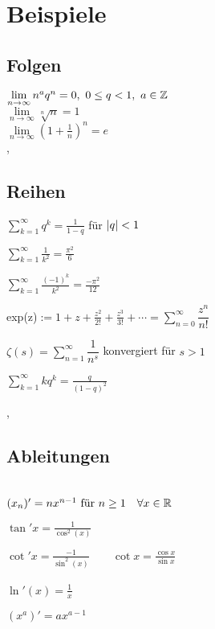 \section{Beispiele}

\subsection{Folgen}

\Bsp[2.2.3] $\lim\limits_{n \rightarrow \infty} n^{a}q^{n} = 0, \ 0 \leq q < 1, \ a \in \mathbb{Z}$ \\
\Bsp[2.2.5] $\lim\limits_{n \rightarrow \infty} \sqrt[n]{n} = 1$ \\
\Bsp[2.2.6] $\lim\limits_{n \rightarrow \infty} (1 + \frac{1}{n})^n = e$ \\

\sep

\subsection{Reihen}

\Bsp[2.7.2]  $\sum_{k=1}^{\infty} q^k = \frac{1}{1-q} $ für $\left\lvert q \right\rvert < 1$

\Bsp $\sum_{k=1}^{\infty} \frac{1}{k^2} = \frac{\pi^2}{6}$ 

\Bsp  $\sum_{k=1}^{\infty} \frac{(-1)^k}{k^2} = \frac{-\pi^2}{12}$ 

\Bsp exp(z)$ := 1 + z + \frac{z^2}{2!} + \frac{z^3}{3!} + \cdots = \sum_{n=0}^{\infty} \dfrac{z^{n}}{n!}$

\Bsp $\zeta(s) =  \sum_{n=1}^{\infty} \dfrac{1}{n^s}$ konvergiert für $s > 1$

\Bsp $\sum_{k=1}^{\infty} k q^k = \frac{q}{(1- q)^2}$ 

\sep

\subsection{Ableitungen}

\Bsp[4.1.10] \\
\((x_n)' = n x^{n - 1}$ für $ n \geq 1\quad \forall x \in \R \)

\(\tan' x = \frac{1}{\cos^2 (x)} \)

\(\cot' x = \frac{-1}{\sin^2 (x)} \quad \quad \cot x = \frac{\cos x}{\sin x}  \) \\

\Bsp[4.1.13]  \\
\(\ln'(x) = \frac{1}{x} \)

\((x^a)' = a x^{a - 1} \) \\

